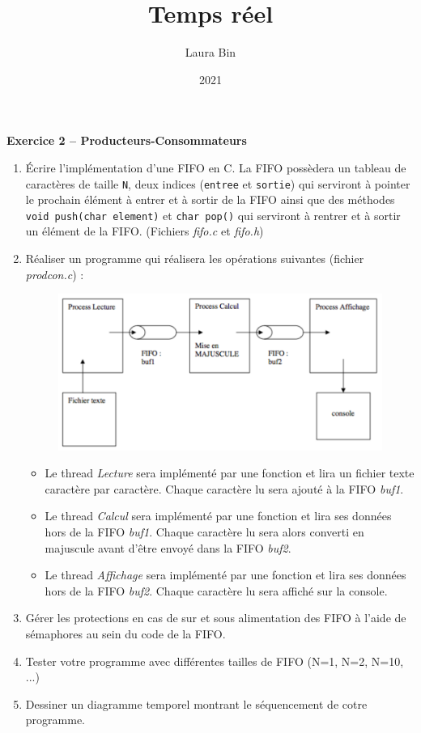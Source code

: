 \documentclass{article}
\title{Temps réel}
\date{2021}
\author{Laura Bin}
\begin{document}

    \begin{center}
        \textbf{\LARGE Exercice 2 -- Producteurs-Consommateurs}
    \end{center}

    \begin{enumerate}
        \item Écrire l'implémentation d'une FIFO en C. La FIFO possèdera un tableau de caractères de taille \texttt{N}, deux indices (\texttt{entree} et \texttt{sortie}) qui serviront à pointer le prochain élément à entrer et à sortir de la FIFO ainsi que des méthodes \texttt{void push(char element)} et \texttt{char pop()} qui serviront à rentrer et à sortir un élément de la FIFO. (Fichiers \emph{fifo.c} et \emph{fifo.h})
        \item Réaliser un programme qui réalisera les opérations suivantes (fichier \emph{prodcon.c}) :
        \begin{figure}[H]
            \centering
            \includegraphics[width=.8\textwidth]{./screenshots/enonce.png}
        \end{figure}
        \begin{itemize}[label=\textbullet]
            \item Le thread \emph{Lecture} sera implémenté par une fonction et lira un fichier texte caractère par caractère. Chaque caractère lu sera ajouté à la FIFO \emph{buf1}.
            \item Le thread \emph{Calcul} sera implémenté par une fonction et lira ses données hors de la FIFO \emph{buf1}. Chaque caractère lu sera alors converti en majuscule avant d'être envoyé dans la FIFO \emph{buf2}.
            \item Le thread \emph{Affichage} sera implémenté par une fonction et lira ses données hors de la FIFO \emph{buf2}. Chaque caractère lu sera affiché sur la console.
        \end{itemize}
        \item Gérer les protections en cas de sur et sous alimentation des FIFO à l'aide de sémaphores au sein du code de la FIFO.
        \item Tester votre programme avec différentes tailles de FIFO (N=1, N=2, N=10, ...)
        \item Dessiner un diagramme temporel montrant le séquencement de cotre programme.
    \end{enumerate}
\end{document}
